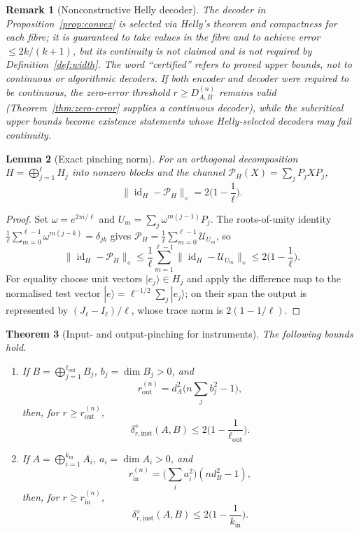 \documentclass[11pt,a4paper]{article}
\newtheorem{theorem}{Theorem}[section]
\newtheorem{lemma}[theorem]{Lemma}
\newtheorem{remark}[theorem]{Remark}
\newcommand{\id}{\operatorname{id}}
\begin{document}
\begin{remark}[Nonconstructive Helly decoder]
\label{rem:nonconstructive}
The decoder in Proposition~\ref{prop:convex} is selected via Helly's theorem and compactness for each fibre; it is guaranteed to take values in the fibre and to achieve error $\le2k/(k+1)$, but its continuity is not claimed and is not required by Definition~\ref{def:width}. The word ``certified'' refers to proved upper bounds, not to continuous or algorithmic decoders. If both encoder and decoder were required to be continuous, the zero-error threshold $r\ge D_{A,B}^{(n)}$ remains valid (Theorem~\ref{thm:zero-error} supplies a continuous decoder), while the subcritical upper bounds become existence statements whose Helly-selected decoders may fail continuity.
\end{remark}

\begin{lemma}[Exact pinching norm]
\label{lem:pinching-norm}
For an orthogonal decomposition $H=\bigoplus_{j=1}^{\ell}H_j$ into nonzero blocks and the channel $\mathcal P_H(X)=\sum_jP_jXP_j$,
\[
\|\id_H-\mathcal P_H\|_\diamond=2\Big(1-\frac1\ell\Big).
\]
\end{lemma}

\begin{proof}
Set $\omega=e^{2\pi i/\ell}$ and $U_m=\sum_j\omega^{m(j-1)}P_j$. The roots-of-unity identity $\frac1\ell\sum_{m=0}^{\ell-1}\omega^{m(j-k)}=\delta_{jk}$ gives $\mathcal P_H=\frac1\ell\sum_{m=0}^{\ell-1}\mathcal U_{U_m}$, so
\[
\|\id_H-\mathcal P_H\|_\diamond
\le\frac1\ell\sum_{m=1}^{\ell-1}\|\id_H-\mathcal U_{U_m}\|_\diamond
\le2\Big(1-\frac1\ell\Big).
\]
For equality choose unit vectors $|e_j\rangle\in H_j$ and apply the difference map to the normalised test vector $|e\rangle=\ell^{-1/2}\sum_j|e_j\rangle$; on their span the output is represented by $(J_\ell-I_\ell)/\ell$, whose trace norm is $2(1-1/\ell)$.
\end{proof}

\begin{theorem}[Input- and output-pinching for instruments]
\label{thm:pinching}
The following bounds hold.
\begin{enumerate}[leftmargin=*,itemsep=2pt]
\item If $B=\bigoplus_{j=1}^{\ell_{\mathrm{out}}}B_j$, $b_j=\dim B_j>0$, and
\[
r_{\mathrm{out}}^{(n)}=d_A^2\Big(n\sum_jb_j^2-1\Big),
\]
then, for $r\ge r_{\mathrm{out}}^{(n)}$,
\[
\delta_{r,\mathrm{inst}}^{\diamond}(A,B)\le2\Big(1-\frac1{\ell_{\mathrm{out}}}\Big).
\]
\item If $A=\bigoplus_{i=1}^{k_{\mathrm{in}}}A_i$, $a_i=\dim A_i>0$, and
\[
r_{\mathrm{in}}^{(n)}=\Big(\sum_ia_i^2\Big)(nd_B^2-1),
\]
then, for $r\ge r_{\mathrm{in}}^{(n)}$,
\[
\delta_{r,\mathrm{inst}}^{\diamond}(A,B)\le2\Big(1-\frac1{k_{\mathrm{in}}}\Big).
\]
\end{enumerate}
\end{theorem}
\end{document}
